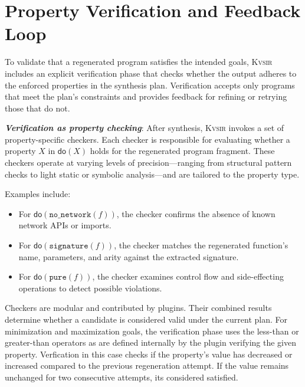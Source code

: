 \documentclass[sigplan]{acmart}
\newcommand{\sys}{{\scshape Kv{\textalpha}sir}\xspace}
\newcommand{\heading}[1]{\vspace{2pt}\noindent\textbf{\emph{#1}}:\enspace}
\begin{document}

\section{Property Verification and Feedback Loop}
\label{sec:verification}

To validate that a regenerated program satisfies the intended goals, \sys includes an explicit verification phase that checks whether the output adheres to the enforced properties in the synthesis plan. 
Verification accepts only programs that meet the plan's constraints and provides feedback for refining or retrying those that do not.

\heading{Verification as property checking}
After synthesis, \sys invokes a set of property-specific checkers. Each checker is responsible for evaluating whether a property $X$ in $\mathsf{do}(X)$ holds for the regenerated program fragment. These checkers operate at varying levels of precision—ranging from structural pattern checks to light static or symbolic analysis—and are tailored to the property type.

Examples include:
\begin{itemize}
  \item For $\mathsf{do}(\texttt{no\_network}(f))$, the checker confirms the absence of known network APIs or imports.
  \item For $\mathsf{do}(\texttt{signature}(f))$, the checker matches the regenerated function's name, parameters, and arity against the extracted signature.
  \item For $\mathsf{do}(\texttt{pure}(f))$, the checker examines control flow and side-effecting operations to detect possible violations.
\end{itemize}

Checkers are modular and contributed by plugins. Their combined results determine whether a candidate is considered valid under the current plan.
For minimization and maximization goals, the verification phase uses the less-than or greater-than operators as are defined internally by the plugin verifying the given property.
Verfication in this case checks if the property's value has decreased or increased compared 
to the previous regeneration attempt. If the value remains unchanged for two consecutive attempts, its considered satisfied.
\end{document}
